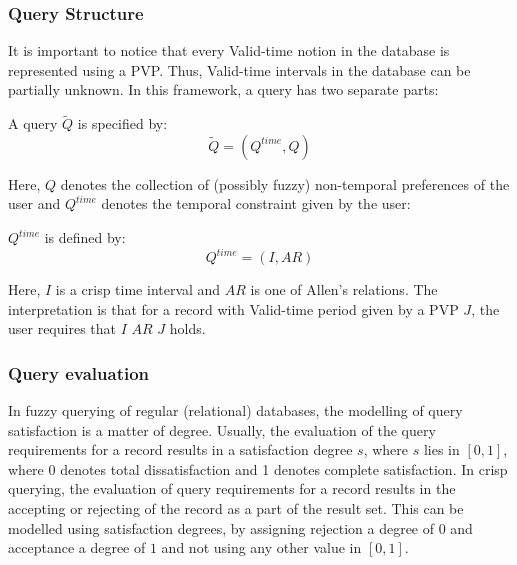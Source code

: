 
\subsubsection{Query Structure}
It is important to notice that every Valid-time notion in the database is represented using a PVP. Thus, Valid-time intervals in the database can be partially unknown. In this framework, a query has two separate parts:



\begin{definition}
A query $\tilde Q$ is specified by:
\begin{equation}
\label{eq:query-definition}
\tilde Q = \left( Q^{time}, Q \right)
\end{equation}
\end{definition}
Here, $Q$ denotes the collection of (possibly fuzzy) non-temporal preferences of the user and $Q^{time}$ denotes the temporal constraint given by the user:
\begin{definition}
 $Q^{time}$ is defined by:
\begin{equation}
Q^{time} = \left( I , AR \right)
\end{equation}
\end{definition}
Here, $I$ is a crisp time interval and $AR$ is one of Allen's relations\cite{Allen83}. The interpretation is that for a record with Valid-time period given by a PVP $J$, the user requires that $I$ $AR$ $J$ holds.



\subsubsection{Query evaluation}
In fuzzy querying of regular (relational) databases, the modelling of query satisfaction is a matter of degree. Usually, the evaluation of the query requirements for a record results in a satisfaction degree $s$, where $s$ lies in $\left[0,1\right]$, where 0 denotes total dissatisfaction and 1 denotes complete satisfaction. In crisp querying, the evaluation of query requirements for a record results in the accepting or rejecting of the record as a part of the result set. This can be modelled using satisfaction degrees, by assigning rejection a degree of $0$ and acceptance a degree of $1$ and not using any other value in $\left[0,1\right]$.

